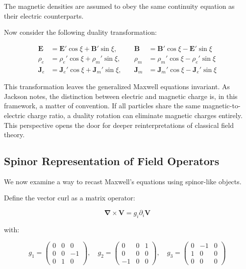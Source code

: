 \documentclass {article}
\renewcommand\vec{\mathbf}
\let\OldS\nabla
\renewcommand{\nabla}{\boldsymbol{\OldS}}
\begin{document}
The magnetic densities are assumed to obey the same continuity equation as their electric counterparts.

Now consider the following duality transformation:

\begin{equation}
\begin{aligned}
\vec{E} &= \vec{E}' \cos \xi + \vec{B}' \sin \xi, \quad
&\vec{B} &= \vec{B}' \cos \xi - \vec{E}' \sin \xi \\
\rho_e &= \rho_e' \cos \xi + \rho_m' \sin \xi, \quad
&\rho_m &= \rho_m' \cos \xi - \rho_e' \sin \xi \\
\vec{J}_e &= \vec{J}_e' \cos \xi + \vec{J}_m' \sin \xi, \quad
&\vec{J}_m &= \vec{J}_m' \cos \xi - \vec{J}_e' \sin \xi
\end{aligned}
\end{equation}


This transformation leaves the generalized Maxwell equations invariant. As Jackson notes, the distinction between electric and magnetic charge is, in this framework, a matter of convention. If all particles share the same magnetic-to-electric charge ratio, a duality rotation can eliminate magnetic charges entirely. This perspective opens the door for deeper reinterpretations of classical field theory.

\subsection{Spinor Representation of Field Operators}

We now examine a way to recast Maxwell’s equations using spinor-like objects.

Define the vector curl as a matrix operator:

\begin{equation}
\nabla \times \vec{V} = g_i \partial_i \vec{V}
\end{equation}

with:

\begin{equation}
g_1 = \begin{pmatrix}
0 & 0 & 0 \\
0 & 0 & -1 \\
0 & 1 & 0
\end{pmatrix}, \quad
g_2 = \begin{pmatrix}
0 & 0 & 1 \\
0 & 0 & 0 \\
-1 & 0 & 0
\end{pmatrix}, \quad
g_3 = \begin{pmatrix}
0 & -1 & 0 \\
1 & 0 & 0 \\
0 & 0 & 0
\end{pmatrix}
\end{equation}
\end{document}

